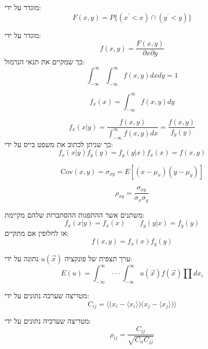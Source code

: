 \documentclass{tstextbook}
\begin{document}
\begin{definition}
מוגדר על ידי:
$$F(x,y)=P\{(x^{\prime}<x)\cap(y^{\prime}<y)\}$$

\end{definition}
\begin{definition}
מוגדר על ידי:
$$f(x,y)=\frac{F(x,y)}{\partial x\partial y}$$
כך שמקיים את תנאי הנרמול:
$$\int_{-\infty}^{\infty}\int_{-\infty}^{\infty}f(x,y)d x d y=1$$

\end{definition}
\begin{definition}
$$f_{x}(x)=\int_{-\infty}^{\infty}f(x,y)d y$$

\end{definition}
\begin{proposition}
$$f_{x}(x|y)={\frac{f(x,y)}{\int_{-\infty}^{\infty}f(x,y)d x}}={\frac{f(x,y)}{f_{y}(y)}}$$
כך שניתן לכתוב את משפט בייס על ידי:
$$f_{x}(x|y)f_{y}(y)=f_{y}(y|x)f_{x}(x)=f(x,y)$$

\end{proposition}
\begin{definition}
$$\mathrm{Cov}(x,y)=\sigma_{x y}=E[(x-\mu_{x})(y-\mu_{y})]$$

\end{definition}
\begin{definition}
$$\rho_{x y}={\frac{\sigma_{x y}}{\sigma_{x}\sigma_{y}}}$$

\end{definition}
\begin{definition}
משתנים אשר ההתפגות ההסתברות שלהם מקיימת:
$$f_{x}(x|y)=f_{x}(x)\qquad f_{y}(y|x)=f_{y}(y)$$
או לחלופין אם מתקיים:
$$f(x,y)=f_{x}(x)f_{y}(y)$$

\end{definition}
\begin{proposition}
ערך תצפית של פונקציה \(u\left( \vec{x} \right)\) נתונה על ידי:
$$E(u)=\int_{-\infty}^{\infty}\cdot\cdot\cdot\int_{-\infty}^{\infty}u(\vec{x})f(\vec{x})\prod d x_{i}$$

\end{proposition}
\begin{definition}
מטריצה שערכה נתונים על ידי:
$$C_{i j}=\langle{\big(}x_{i}-\langle x_{i}\rangle{\big)}{\big(}x_{j}-\langle x_{j}\rangle{\big)}\rangle$$

\end{definition}
\begin{definition}
מטריצה שערכיה נתונים על ידי:
$$\rho_{i j}={\frac{C_{i j}}{\sqrt{C_{i i}C_{j j}}}}$$

\end{definition}
\end{document}
